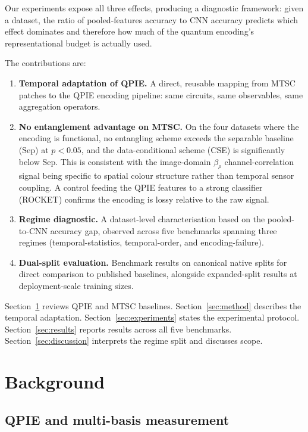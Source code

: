 \documentclass[conference,compsoc]{IEEEtran}
\begin{document}
Our experiments expose all three effects, producing a diagnostic
framework: given a dataset, the ratio of pooled-features accuracy to
CNN accuracy predicts which effect dominates and therefore how much
of the quantum encoding's representational budget is actually used.

\noindent The contributions are:
\begin{enumerate}
  \item \textbf{Temporal adaptation of QPIE.}
    A direct, reusable mapping from MTSC patches to the QPIE
    encoding pipeline: same circuits, same observables, same
    aggregation operators.
  \item \textbf{No entanglement advantage on MTSC.}
    On the four datasets where the encoding is functional, no entangling
    scheme exceeds the separable baseline (Sep) at $p < 0.05$, and the
    data-conditional scheme (CSE) is significantly below Sep. This is
    consistent with the image-domain $\beta_\rho$ channel-correlation
    signal being specific to spatial colour structure rather than
    temporal sensor coupling. A control feeding the QPIE features to a
    strong classifier (ROCKET) confirms the encoding is lossy relative
    to the raw signal.
  \item \textbf{Regime diagnostic.}
    A dataset-level characterisation based on the pooled-to-CNN
    accuracy gap, observed across five benchmarks spanning three
    regimes (temporal-statistics, temporal-order, and encoding-failure).
  \item \textbf{Dual-split evaluation.}
    Benchmark results on canonical native splits for direct comparison
    to published baselines, alongside expanded-split results at
    deployment-scale training sizes.
\end{enumerate}

Section~\ref{sec:background} reviews QPIE and MTSC baselines.
Section~\ref{sec:method} describes the temporal adaptation.
Section~\ref{sec:experiments} states the experimental protocol.
Section~\ref{sec:results} reports results across all five benchmarks.
Section~\ref{sec:discussion} interprets the regime split and
discusses scope.

\section{Background}
\label{sec:background}

\subsection{QPIE and multi-basis measurement}
\end{document}
